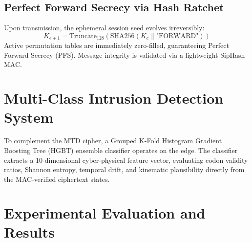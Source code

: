 \documentclass[journal]{IEEEtran}
\begin{document}
\subsection{Perfect Forward Secrecy via Hash Ratchet}
Upon transmission, the ephemeral session seed evolves irreversibly:
\begin{equation}
K_{e+1} = \text{Truncate}_{128}(\text{SHA256}(K_e \parallel \text{"FORWARD"}))
\end{equation}
Active permutation tables are immediately zero-filled, guaranteeing Perfect Forward Secrecy (PFS). Message integrity is validated via a lightweight SipHash MAC.

\section{Multi-Class Intrusion Detection System}
To complement the MTD cipher, a Grouped K-Fold Histogram Gradient Boosting Tree (HGBT) ensemble classifier operates on the edge. The classifier extracts a 10-dimensional cyber-physical feature vector, evaluating codon validity ratios, Shannon entropy, temporal drift, and kinematic plausibility directly from the MAC-verified ciphertext states.

\section{Experimental Evaluation and Results}
\end{document}
